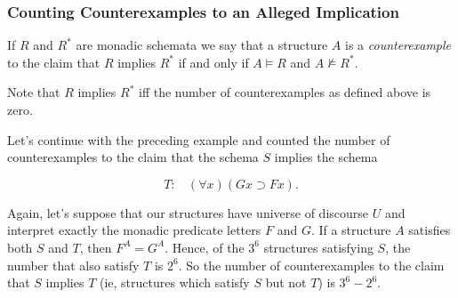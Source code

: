 \subsubsection*{Counting Counterexamples to an Alleged Implication}
If $R$ and $R^*$ are monadic schemata we say that a structure $A$ is a \emph{counterexample} to the claim that $R$ implies $R^*$ if and only if $A\models R$ and $A\not\models R^*$.

\begin{aside}
    Note that $R$ implies $R^*$ iff the number of counterexamples as defined above is zero.
\end{aside}

Let's continue with the preceding example and counted the number of counterexamples to the claim that the schema $S$ implies the schema

\[T:\ \ \ \ (\forall x)(Gx\supset Fx).\]

Again, let's suppose that our structures have universe of discourse $U$ and interpret exactly the monadic predicate letters $F$ and $G$. If a structure $A$ satisfies both $S$ and $T$, then $F^A=G^A$. Hence, of the $3^6$ structures satisfying $S$, the number that also satisfy $T$ is $2^6$. So the number of counterexamples to the claim that $S$ implies $T$ (ie, structures which satisfy $S$ but not $T$) is $3^6 - 2^6$.  
